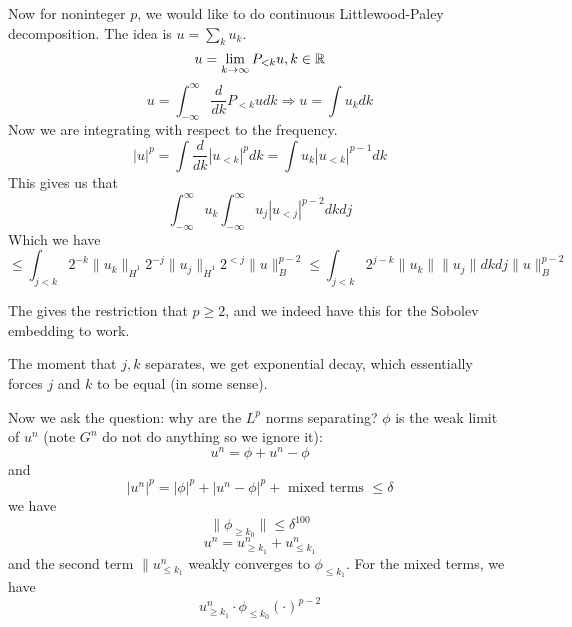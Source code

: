 Now for noninteger $p$, we would like to do continuous Littlewood-Paley decomposition. The idea is $u=\sum_ku_k$.
\begin{equation*}
    u=\lim_{k\to\infty}P_{<k}u, k\in\mathbb{R}
\end{equation*}
\begin{equation*}
    u=\int_{-\infty}^\infty \frac{d}{dk}P_{<k}udk\Rightarrow u=\int u_kdk
\end{equation*}
Now we are integrating with respect to the frequency.
\begin{equation*}
    |u|^p=\int\frac{d}{dk}|u_{<k}|^pdk=\int u_k|u_{<k}|^{p-1}dk
\end{equation*}
This gives us that
\begin{equation*}
    \int_{-\infty}^\infty u_k\int_{-\infty}^\infty u_j|u_{<j}|^{p-2}dkdj
\end{equation*}
Which we have
\begin{equation*}
    \leq \int_{j<k}2^{-k}\|u_k\|_{\dot{H}^1}2^{-j}\|u_j\|_{\dot{H}^1}2^{<j}\|u\|_B^{p-2}\leq \int_{j<k}2^{j-k}\|u_k\|\|u_j\|dkdj\|u\|_B^{p-2}
\end{equation*}
\begin{note}
    The gives the restriction that $p\geq 2$, and we indeed have this for the Sobolev embedding to work.
\end{note}
The moment that $j,k$ separates, we get exponential decay, which essentially forces $j$ and $k$ to be equal (in some sense).

Now we ask the question: why are the $L^p$ norms separating? $\phi$ is the weak limit of $u^n$ (note $G^n$ do not do anything so we ignore it):
\begin{equation*}
    u^n=\phi+u^n-\phi
\end{equation*}
and 
\begin{equation*}
    |u^n|^p=|\phi|^p+|u^n-\phi|^p+\text{ mixed terms }\leq\delta
\end{equation*}
we have 
\begin{equation*}
    \|\phi_{\geq k_0}\|\leq\delta^100
\end{equation*}
\begin{equation*}
    u^n=u_{\geq k_1}^n+u_{\leq k_1}^n
\end{equation*}
and the second term $\|u_{\leq k_1}^n$ weakly converges to $\phi_{\leq k_1}$. For the mixed terms, we have
\begin{equation*}
    u_{\geq k_1}^n\cdot\phi_{\leq k_0}(\cdot)^{p-2}
\end{equation*}

